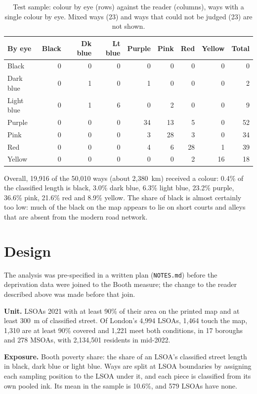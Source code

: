 \documentclass[11pt,a4paper]{article}
\begin{document}
\begin{table}[tbp]\centering\small\caption{Test sample: colour by eye (rows) against the reader (columns), ways with a single colour by eye. Mixed ways (23) and ways that could not be judged (23) are not shown.}\label{tab:valid}\begin{tabular}{lrrrrrrrr}\toprule By eye & Black & Dk blue & Lt blue & Purple & Pink & Red & Yellow & Total\\\midrule
Black & 0 & 0 & 0 & 0 & 0 & 0 & 0 & 0\\
Dark blue & 0 & 1 & 0 & 1 & 0 & 0 & 0 & 2\\
Light blue & 0 & 1 & 6 & 0 & 2 & 0 & 0 & 9\\
Purple & 0 & 0 & 0 & 34 & 13 & 5 & 0 & 52\\
Pink & 0 & 0 & 0 & 3 & 28 & 3 & 0 & 34\\
Red & 0 & 0 & 0 & 4 & 6 & 28 & 1 & 39\\
Yellow & 0 & 0 & 0 & 0 & 0 & 2 & 16 & 18\\
\bottomrule\end{tabular}\end{table}

Overall, 19,916 of the 50,010 ways (about 2,380~km) received a colour: 0.4\% of the classified length is black, 3.0\% dark blue, 6.3\% light blue, 23.2\% purple, 36.6\% pink, 21.6\% red and 8.9\% yellow. The share of black is almost certainly too low: much of the black on the map appears to lie on short courts and alleys that are absent from the modern road network.

\section{Design}\label{sec:design}

The analysis was pre-specified in a written plan (\texttt{NOTES.md}) before the deprivation data were joined to the Booth measure; the change to the reader described above was made before that join.

\textbf{Unit.} LSOAs 2021 with at least 90\% of their area on the printed map and at least 300~m of classified street. Of London's 4,994 LSOAs, 1,464 touch the map, 1,310 are at least 90\% covered and 1,221 meet both conditions, in 17 boroughs and 278 MSOAs, with 2,134,501 residents in mid-2022.

\textbf{Exposure.} Booth poverty share: the share of an LSOA's classified street length in black, dark blue or light blue. Ways are split at LSOA boundaries by assigning each sampling position to the LSOA under it, and each piece is classified from its own pooled ink. Its mean in the sample is 10.6\%, and 579 LSOAs have none.
\end{document}
